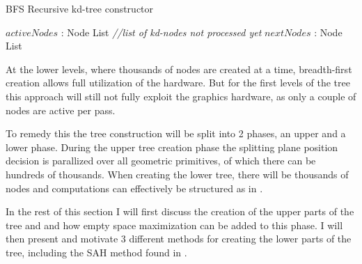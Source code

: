 \begin{algorithm}
  \caption{BFS Recursive kd-tree constructor}
  \label{alg:bfsKDTreeCreator}
  \begin{algorithmic}
              {$activeNodes$ : Node List  \textit{\color{gray}//list of kd-nodes not processed yet}}
              {$nextNodes$ : Node List}
              {
                 \ELSE
                 \ENDIF
               \ENDFOR}
  \end{algorithmic}
\end{algorithm}


At the lower levels, where thousands of nodes are created at a time,
breadth-first creation allows full utilization of the hardware. But
for the first levels of the tree this approach will still not fully
exploit the graphics hardware, as only a couple of nodes are active
per pass.

To remedy this the tree construction will be split into 2 phases, an
upper and a lower phase. During the upper tree creation phase the
splitting plane position decision is parallized over all geometric
primitives, of which there can be hundreds of thousands. When creating
the lower tree, there will be thousands of nodes and computations can
effectively be structured as in .


In the rest of this section I will first discuss the creation of the
upper parts of the tree and and how empty space maximization can be
added to this phase. I will then present and motivate 3 different
methods for creating the lower parts of the tree, including the SAH
method found in \zhou{}.


